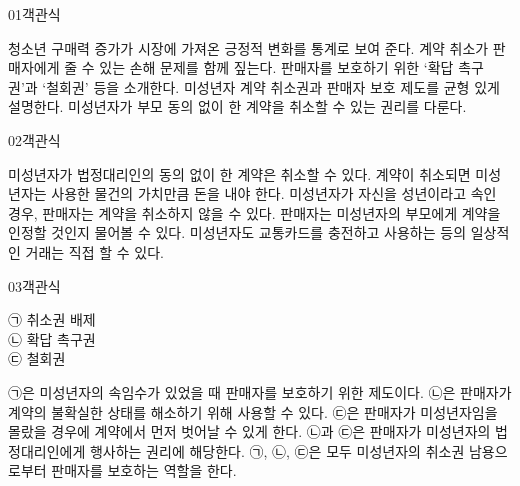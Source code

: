 \documentclass[fs9,seriesRus]{korfarm-base}
\begin{document}
\par\medskip
\kfBeginMC
\begin{kfQBlock}{01}{객관식}
\begin{kfChoices}
\kfChoice 청소년 구매력 증가가 시장에 가져온 긍정적 변화를 통계로 보여 준다.
\kfChoice 계약 취소가 판매자에게 줄 수 있는 손해 문제를 함께 짚는다.
\kfChoice 판매자를 보호하기 위한 ‘확답 촉구권’과 ‘철회권’ 등을 소개한다.
\kfChoice 미성년자 계약 취소권과 판매자 보호 제도를 균형 있게 설명한다.
\kfChoice 미성년자가 부모 동의 없이 한 계약을 취소할 수 있는 권리를 다룬다.
\end{kfChoices}
\end{kfQBlock}
\begin{kfQBlock}{02}{객관식}
\begin{kfChoices}
\kfChoice 미성년자가 법정대리인의 동의 없이 한 계약은 취소할 수 있다.
\kfChoice 계약이 취소되면 미성년자는 사용한 물건의 가치만큼 돈을 내야 한다.
\kfChoice 미성년자가 자신을 성년이라고 속인 경우, 판매자는 계약을 취소하지 않을 수 있다.
\kfChoice 판매자는 미성년자의 부모에게 계약을 인정할 것인지 물어볼 수 있다.
\kfChoice 미성년자도 교통카드를 충전하고 사용하는 등의 일상적인 거래는 직접 할 수 있다.
\end{kfChoices}
\end{kfQBlock}
\begin{kfQBlock}{03}{객관식}
\begin{kfEvidence}㉠ 취소권 배제 \\\relax
㉡ 확답 촉구권 \\\relax
㉢ 철회권\end{kfEvidence}
\begin{kfChoices}
\kfChoice ㉠은 미성년자의 속임수가 있었을 때 판매자를 보호하기 위한 제도이다.
\kfChoice ㉡은 판매자가 계약의 불확실한 상태를 해소하기 위해 사용할 수 있다.
\kfChoice ㉢은 판매자가 미성년자임을 몰랐을 경우에 계약에서 먼저 벗어날 수 있게 한다.
\kfChoice ㉡과 ㉢은 판매자가 미성년자의 법정대리인에게 행사하는 권리에 해당한다.
\kfChoice ㉠, ㉡, ㉢은 모두 미성년자의 취소권 남용으로부터 판매자를 보호하는 역할을 한다.
\end{kfChoices}
\end{kfQBlock}
\end{document}
